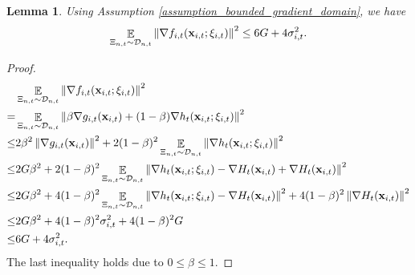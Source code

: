 \documentclass{article}
\newtheorem{Lemma}{\bf{Lemma}}
\begin{document}
\begin{Lemma}
\label{lemma_stochastic_gradient_norm_bound}
Using Assumption \ref{assumption_bounded_gradient_domain}, we have
\begin{align}
\nonumber
\mathop{\mathbb{E}}_{ \Xi_{n,t} \sim \mathcal{D}_{n,t} }\left\lVert \nabla f_{i,t}({\bf x}_{i,t};\xi_{i,t})\right\rVert^2 \le 6G  + 4 \sigma_{i,t}^2.
\end{align}


\end{Lemma}
\begin{proof}

\begin{align}
\nonumber
& \mathop{\mathbb{E}}_{ \Xi_{n,t} \sim \mathcal{D}_{n,t} }\left\lVert \nabla f_{i,t}({\bf x}_{i,t};\xi_{i,t})\right\rVert^2 \\ \nonumber 
= & \mathop{\mathbb{E}}_{ \Xi_{n,t} \sim \mathcal{D}_{n,t} }\left\lVert \beta \nabla g_{i,t}({\bf x}_{i,t}) + (1-\beta)\nabla h_t({\bf x}_{i,t};\xi_{i,t})\right\rVert^2 \\ \nonumber 
\le &  2\beta^2 \left\lVert \nabla g_{i,t}({\bf x}_{i,t}) \right\rVert^2 + 2(1-\beta)^2 \mathop{\mathbb{E}}_{ \Xi_{n,t} \sim \mathcal{D}_{n,t} } \left\lVert \nabla h_t({\bf x}_{i,t};\xi_{i,t}) \right\rVert^2 \\ \nonumber 
\le & 2G\beta^2  + 2(1-\beta)^2 \mathop{\mathbb{E}}_{ \Xi_{n,t} \sim \mathcal{D}_{n,t} } \left\lVert \nabla h_t({\bf x}_{i,t};\xi_{i,t}) - \nabla H_t({\bf x}_{i,t}) + \nabla H_t({\bf x}_{i,t})\right\rVert^2 \\ \nonumber 
\le & 2G\beta^2  +  4(1-\beta)^2 \mathop{\mathbb{E}}_{ \Xi_{n,t} \sim \mathcal{D}_{n,t} } \left\lVert \nabla h_t({\bf x}_{i,t};\xi_{i,t}) - \nabla H_t({\bf x}_{i,t}) \right\rVert^2 +  4(1-\beta)^2 \left\lVert \nabla H_t({\bf x}_{i,t})\right\rVert^2 \\ \nonumber 
\le & 2G\beta^2  + 4(1-\beta)^2 \sigma_{i,t}^2 + 4(1-\beta)^2 G \\ \nonumber 
\le & 6G  + 4 \sigma_{i,t}^2.
\end{align} The last inequality holds due to $0\le \beta \le 1$.
\end{proof}
\end{document}
